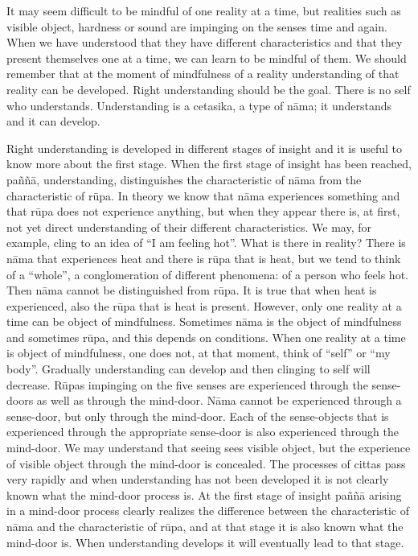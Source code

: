\documentclass{book}
\begin{document}
It may seem difficult to be mindful of one reality at a time, but
realities such as visible object, hardness or sound are impinging on
the senses time and again. When we have understood that they have
different characteristics and that they present themselves one at a
time, we can learn to be mindful of them. We should remember that at
the moment of mindfulness of a reality understanding of that reality
can be developed. Right understanding should be the goal. There is no
self who understands. Understanding is a cetasika, a type of n{\=a}ma;
it understands and it can develop.

Right understanding is developed in different stages of insight and it
is useful to know more about the first stage. When the first stage of
insight has been reached, pa\~n\~n{\=a}, understanding, distinguishes
the characteristic of n{\=a}ma from the characteristic of r\=upa. In
theory we know that n{\=a}ma experiences something and that r\=upa does
not experience anything, but when they appear there is, at first, not
yet direct understanding of their different characteristics. We may,
for example, cling to an idea of ``I am feeling hot''. What is there in
reality? There is n{\=a}ma that experiences heat and there is r\=upa
that is heat, but we tend to think of a ``whole'', a conglomeration of
different phenomena: of a person who feels hot. Then n{\=a}ma cannot be
distinguished from r\=upa. It is true that when heat is experienced,
also the r\=upa that is heat is present. However, only one reality at a
time can be object of mindfulness. Sometimes n{\=a}ma is the object of
mindfulness and sometimes r\=upa, and this depends on conditions. When
one reality at a time is object of mindfulness, one does not, at that
moment, think of ``self'' or ``my body''. Gradually understanding can
develop and then clinging to self will decrease.
R\=upas impinging on the five senses are experienced through the
sense-doors as well as through the mind-door. N{\=a}ma cannot be
experienced through a sense-door, but only through the mind-door.
Each of the sense-objects that is experienced through the appropriate
sense-door is also experienced through the mind-door. We may
understand that seeing sees visible object, but the experience of
visible object through the mind-door is concealed. The processes of
cittas pass very rapidly and when understanding has not been developed
it is not clearly known what the mind-door process is. At the first
stage of insight pa\~n\~n{\=a} arising in a mind-door process clearly
realizes the difference between the characteristic of n{\=a}ma and the
characteristic of r\=upa, and at that stage it is also known what the
mind-door is. When understanding develops it will eventually lead to
that stage. 
\end{document}
